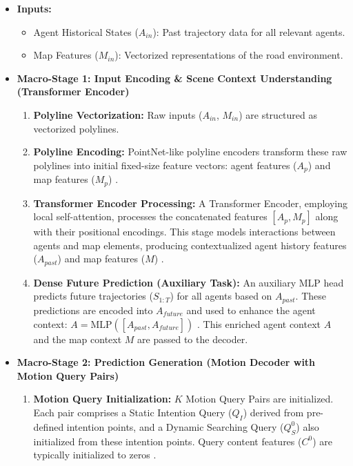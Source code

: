\begin{itemize}
    \item \textbf{Inputs:}
    \begin{itemize}
        \item Agent Historical States ($A_{in}$): Past trajectory data for all relevant agents.
        \item Map Features ($M_{in}$): Vectorized representations of the road environment.
    \end{itemize}
    \item \textbf{Macro-Stage 1: Input Encoding \& Scene Context Understanding (Transformer Encoder)}
    \begin{enumerate}
        \item \textbf{Polyline Vectorization:} Raw inputs ($A_{in}$, $M_{in}$) are structured as vectorized polylines.
        \item \textbf{Polyline Encoding:} PointNet-like polyline encoders transform these raw polylines into initial fixed-size feature vectors: agent features ($A_p$) and map features ($M_p$) \cite{Shi2022MTR, Shi2022MTR_A}.
        \item \textbf{Transformer Encoder Processing:} A Transformer Encoder, employing local self-attention, processes the concatenated features $[A_p, M_p]$ along with their positional encodings. This stage models interactions between agents and map elements, producing contextualized agent history features ($A_{past}$) and map features ($M$) \cite{Shi2022MTR, Shi2022MTR_A}.
        \item \textbf{Dense Future Prediction (Auxiliary Task):} An auxiliary MLP head predicts future trajectories ($S_{1:T}$) for all agents based on $A_{past}$. These predictions are encoded into $A_{future}$ and used to enhance the agent context: $A = \text{MLP}([A_{past}, A_{future}])$ \cite{Shi2022MTR}. This enriched agent context $A$ and the map context $M$ are passed to the decoder.
    \end{enumerate}
    \item \textbf{Macro-Stage 2: Prediction Generation (Motion Decoder with Motion Query Pairs)}
    \begin{enumerate}
        \item \textbf{Motion Query Initialization:} $K$ Motion Query Pairs are initialized. Each pair comprises a Static Intention Query ($Q_I$) derived from pre-defined intention points, and a Dynamic Searching Query ($Q_S^0$) also initialized from these intention points. Query content features ($C^0$) are typically initialized to zeros \cite{Shi2022MTR}.

\end{enumerate}
\end{itemize}
